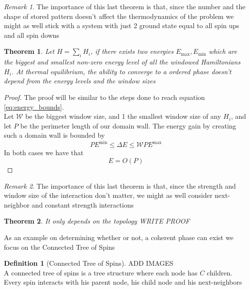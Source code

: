 \documentclass{article}
\newtheorem{theorem}{Theorem}[section]
\theoremstyle{definition}
\newtheorem{definition}{Definition}[section]
\theoremstyle{remark}
\newtheorem*{remark}{Remark}
\begin{document}
\begin{remark}
    The importance of this last theorem is that, since the number and the shape of stored pattern doesn't affect the thermodynamics of the problem we might as well stick with a system with just 2 ground state equal to all spin ups and all spin downs
\end{remark}

\begin{theorem}
    \label{th:no-care-H}
    Let $H=\sum_i H_i$, if there exists two energies $E_\textrm{max},E_\textrm{min}$ which are the biggest and smallest non-zero energy level of all the windowed Hamiltonians $H_i$. At thermal equilibrium, the ability to converge to a ordered phase doesn’t depend from the energy levels and the window sizes
\end{theorem}
\begin{proof}
    The proof will be similar to the steps done to reach equation \ref{eq:energy_bounds}.\\
    Let $\mathcal W$ be the biggest window size, and 1 the smallest window size of any $H_i$, and let $P$ be the perimeter length of our domain wall. The energy gain by creating such a domain wall is bounded by 
    \begin{equation}
        P E^\textrm{min}\le\Delta E\le \mathcal W PE^\textrm {max}
    \end{equation}
    In both cases we have that
    \begin{equation}
        E=O(P)
    \end{equation}
\end{proof}
\begin{remark}
    The importance of this last theorem is that, since the strength and window size of the interaction don't matter, we might as well consider next-neighbor and constant strength interactions
\end{remark}
\begin{theorem}
    It only depends on the topology WRITE PROOF
\end{theorem}
As an example on determining whether or not, a coherent phase can exist we focus on the Connected Tree of Spins
\begin{definition}[Connected Tree of Spins]
    ADD IMAGES\\
    A connected tree of spins is a tree structure where each node has $C$ children. Every spin interacts with his parent node, his child node and his next-neighbors
\end{definition}
\end{document}
